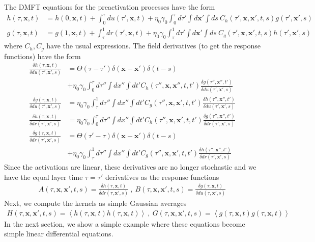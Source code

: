 \documentclass{article} %
\def\x{\bm x}
\begin{document}
The DMFT equations for the preactivation processes have the form
\begin{align}
    h(\tau,\x,t) &= h(0,\x,t) + \int_0^\tau du(\tau',\x,t) + \eta_0 \gamma_0 \int_0^\tau d\tau' \int d\x' \int ds \ C_h(\tau',\x,\x',t,s) g(\tau',\x',s) \nonumber
    \\
    g(\tau,\x,t) &= g(1,\x,t) + \int_\tau^1 dr(\tau',\x,t) + \eta_0 \gamma_0 \int_\tau^1 d\tau' \int d\x' \int ds \ C_g(\tau',\x,\x',t,s) h(\tau',\x',s)
\end{align}
where $C_h, C_g$ have the usual expressions. The field derivatives (to get the response functions) have the form
\begin{align}
    \frac{\delta h(\tau,\x,t)}{\delta du(\tau',\x',s)}& = \Theta(\tau-\tau')\delta(\x-\x')\delta(t-s) \nonumber
    \\
    &+ \eta_0 \gamma_0 \int_0^\tau d\tau'' \int dx'' \int dt' C_h(\tau'',\x,\x'',t,t') \frac{\delta g(\tau'',\x'',t')}{\delta du(\tau',\x',s)} \nonumber
    \\
    \frac{\delta g(\tau,\x,t)}{\delta du(\tau',\x',s)}& =  \eta_0 \gamma_0 \int_\tau^1 d\tau'' \int dx'' \int dt' C_g(\tau'',\x,\x',t,t') \frac{\delta h(\tau'',\x'',t')}{\delta du(\tau',\x',s)} \nonumber
    \\
    \frac{\delta h(\tau,\x,t)}{\delta dr(\tau',\x',s)}& =  \eta_0 \gamma_0 \int_0^\tau d\tau'' \int dx'' \int dt' C_h(\tau'',\x,\x',t,t') \frac{\delta g(\tau'',\x'',t')}{\delta dr(\tau',\x',s)} \nonumber
    \\
    \frac{\delta g(\tau,\x,t)}{\delta dr(\tau',\x',s)}& = \Theta(\tau'-\tau) \delta(\x-\x')\delta(t-s) \nonumber
    \\
    &+  \eta_0 \gamma_0 \int_\tau^1 d\tau'' \int dx'' \int dt' C_g(\tau'',\x,\x',t,t') \frac{\delta h(\tau'',\x'',t')}{\delta dr(\tau',\x',s)} 
\end{align}
Since the activations are linear, these derivatives are no longer stochastic and we have the equal layer time $\tau = \tau'$ derivatives as the response functions
\begin{align}
    A(\tau,\x,\x',t,s) = \frac{\delta h(\tau,\x,t)}{\delta dr(\tau,\x',s)} \ , \ B(\tau,\x,\x',t,s) = \frac{\delta g(\tau,\x,t)}{\delta du(\tau,\x',s)}
\end{align}
Next, we compute the kernels as simple Gaussian averages
\begin{align}
    H(\tau,\x,\x',t,s) = \left< h(\tau,\x,t)  h(\tau,\x,t) \right>
    \ , \    G(\tau,\x,\x',t,s) = \left< g(\tau,\x,t)  g(\tau,\x,t) \right>
\end{align}
In the next section, we show a simple example where these equations become simple linear differential equations. 
\end{document}
